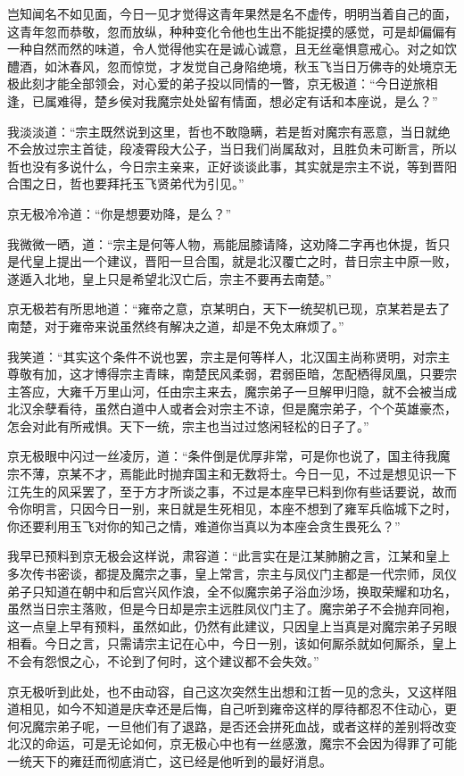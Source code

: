 岂知闻名不如见面，今日一见才觉得这青年果然是名不虚传，明明当着自己的面，这青年忽而恭敬，忽而放纵，种种变化令他也生出不能捉摸的感觉，可是却偏偏有一种自然而然的味道，令人觉得他实在是诚心诚意，且无丝毫惧意戒心。对之如饮醴酒，如沐春风，忽而惊觉，才发觉自己身陷绝境，秋玉飞当日万佛寺的处境京无极此刻才能全部领会，对心爱的弟子投以同情的一瞥，京无极道：“今日逆旅相逢，已属难得，楚乡侯对我魔宗处处留有情面，想必定有话和本座说，是么？”

我淡淡道：“宗主既然说到这里，哲也不敢隐瞒，若是哲对魔宗有恶意，当日就绝不会放过宗主首徒，段凌霄段大公子，当日我们尚属敌对，且胜负未可断言，所以哲也没有多说什么，今日宗主亲来，正好谈谈此事，其实就是宗主不说，等到晋阳合围之日，哲也要拜托玉飞贤弟代为引见。”

京无极冷冷道：“你是想要劝降，是么？”

我微微一晒，道：“宗主是何等人物，焉能屈膝请降，这劝降二字再也休提，哲只是代皇上提出一个建议，晋阳一旦合围，就是北汉覆亡之时，昔日宗主中原一败，遂遁入北地，皇上只是希望北汉亡后，宗主不要再去南楚。”

京无极若有所思地道：“雍帝之意，京某明白，天下一统契机已现，京某若是去了南楚，对于雍帝来说虽然终有解决之道，却是不免太麻烦了。”

我笑道：“其实这个条件不说也罢，宗主是何等样人，北汉国主尚称贤明，对宗主尊敬有加，这才博得宗主青睐，南楚民风柔弱，君弱臣暗，怎配栖得凤凰，只要宗主答应，大雍千万里山河，任由宗主来去，魔宗弟子一旦解甲归隐，就不会被当成北汉余孽看待，虽然白道中人或者会对宗主不谅，但是魔宗弟子，个个英雄豪杰，怎会对此有所戒惧。天下一统，宗主也当过过悠闲轻松的日子了。”

京无极眼中闪过一丝凌厉，道：“条件倒是优厚非常，可是你也说了，国主待我魔宗不薄，京某不才，焉能此时抛弃国主和无数将士。今日一见，不过是想见识一下江先生的风采罢了，至于方才所谈之事，不过是本座早已料到你有些话要说，故而令你明言，只因今日一别，来日就是生死相见，本座不想到了雍军兵临城下之时，你还要利用玉飞对你的知己之情，难道你当真以为本座会贪生畏死么？”

我早已预料到京无极会这样说，肃容道：“此言实在是江某肺腑之言，江某和皇上多次传书密谈，都提及魔宗之事，皇上常言，宗主与凤仪门主都是一代宗师，凤仪弟子只知道在朝中和后宫兴风作浪，全不似魔宗弟子浴血沙场，换取荣耀和功名，虽然当日宗主落败，但是今日却是宗主远胜凤仪门主了。魔宗弟子不会抛弃同袍，这一点皇上早有预料，虽然如此，仍然有此建议，只因皇上当真是对魔宗弟子另眼相看。今日之言，只需请宗主记在心中，今日一别，该如何厮杀就如何厮杀，皇上不会有怨恨之心，不论到了何时，这个建议都不会失效。”

京无极听到此处，也不由动容，自己这次突然生出想和江哲一见的念头，又这样阻道相见，如今不知道是庆幸还是后悔，自己听到雍帝这样的厚待都忍不住动心，更何况魔宗弟子呢，一旦他们有了退路，是否还会拼死血战，或者这样的差别将改变北汉的命运，可是无论如何，京无极心中也有一丝感激，魔宗不会因为得罪了可能一统天下的雍廷而彻底消亡，这已经是他听到的最好消息。

